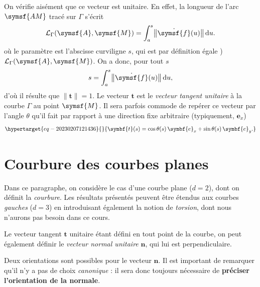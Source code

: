 \documentclass[
  a4paper,
  DIV=11,
  numbers=noendperiod]{scrreprt}
\newcommand{\D}{{\mathrm d}}
\newcommand{\point}[1]{\symsf{#1}}
\renewcommand{\vec}[1]{\symbf{#1}}
\begin{document}
On vérifie aisément que ce vecteur est unitaire. En effet, la longueur
de l'arc \(\point{AM}\) tracé sur \(\Gamma\) s'écrit \[
\mathcal{L}_\Gamma(\point{A}, \point{M}) = \int_a^s \bigl \lVert  \dot{\point{f}}(u) \bigr \rVert \, \D u.
\] où le paramètre est l'abscisse curviligne \(s\), qui est par
définition égale ) \(\mathcal{L}_\Gamma(\point{A}, \point{M})\). On a
donc, pour tout \(s\) \[
s = \int_a^s \bigl \lVert  \dot{\point{f}}(u) \bigr \rVert \, \D u,
\] d'où il résulte que \(\lVert \vec t \rVert = 1\). Le vecteur
\(\vec t\) est le \emph{vecteur tangent unitaire} à la courbe \(\Gamma\)
au point \(\point{M}\). Il sera parfois commode de repérer ce vecteur
par l'angle \(\theta\) qu'il fait par rapport à une direction fixe
arbitraire (typiquement, \(\vec e_x\))
\begin{equation}\protect\hypertarget{eq-20230207121436}{}{
\vec t(s) = \cos \theta(s) \, \vec e_x + \sin \theta(s) \, \vec e_y.
}\label{eq-20230207121436}\end{equation}

\hypertarget{sec-20230214055209}{%
\section{Courbure des courbes planes}\label{sec-20230214055209}}

Dans ce paragraphe, on considère le cas d'une courbe plane (\(d = 2\)),
dont on définit la \emph{courbure}. Les résultats présentés peuvent être
étendus aux courbes \emph{gauches} (\(d = 3\)) en introduisant également
la notion de \emph{torsion}, dont nous n'aurons pas besoin dans ce
cours.

Le vecteur tangent \(\vec t\) unitaire étant défini en tout point de la
courbe, on peut également définir le \emph{vecteur normal unitaire}
\(\vec n\), qui lui est perpendiculaire.

\begin{tcolorbox}[enhanced jigsaw, toptitle=1mm, title=\textcolor{quarto-callout-note-color}{\faInfo}\hspace{0.5em}{Note}, colbacktitle=quarto-callout-note-color!10!white, toprule=.15mm, left=2mm, bottomrule=.15mm, arc=.35mm, breakable, opacityback=0, colframe=quarto-callout-note-color-frame, bottomtitle=1mm, titlerule=0mm, leftrule=.75mm, opacitybacktitle=0.6, coltitle=black, rightrule=.15mm, colback=white]

Deux orientations sont possibles pour le vecteur \(\vec n\). Il est
important de remarquer qu'il n'y a pas de choix \emph{canonique} : il
sera donc toujours nécessaire de \textbf{préciser l'orientation de la
normale}.

\end{tcolorbox}
\end{document}
